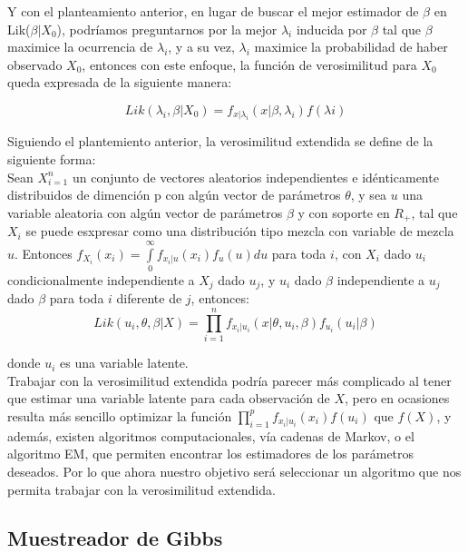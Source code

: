 \documentclass[11pt]{book}
\begin{document}
 
Y con el planteamiento anterior, en lugar de buscar el mejor estimador de $\beta$ en Lik($\beta|X_{0}$), podríamos preguntarnos por la mejor $\lambda_{i}$ inducida por $\beta$ tal que $\beta$ maximice la ocurrencia de $\lambda_{i}$, y a su vez, $\lambda_{i}$ maximice la probabilidad de haber observado  $X_{0}$,  entonces con este enfoque, la función de verosimilitud para $X_{0}$ queda expresada de la siguiente manera:

\begin{equation*}
Lik(\lambda_{i},\beta|X_{0})=f_{x|\lambda_{i}}(x|\beta,\lambda_{i})f(\lambda{i})
\end{equation*}
	
	Siguiendo el plantemiento anterior, la verosimilitud extendida se define de la siguiente forma:\\
	
	Sean ${X}_{i=1}^{n}$ un conjunto de vectores aleatorios independientes e idénticamente distribuidos de dimención p con algún vector de parámetros $\theta$, y sea $u$ una variable aleatoria con algún vector de parámetros $\beta$ y con soporte en $R_{+}$, tal que $X_{i}$ se puede esxpresar como una distribución tipo mezcla con variable de mezcla $u$. Entonces  $f_{X_{i}}(x_{i})=\underset{0}{\overset{\infty }{\int }}f_{x_{i}|u}(x_{i})f_{u}(u)du$ para toda $i$, con $X_{i}$ dado $u_{i}$ condicionalmente independiente a $X_{j}$ dado $u_{j}$, y $ u_{i}$ dado $\beta$ independiente a $u_{j}$ dado $\beta$ para toda $i$ diferente de $j$, entonces:\\
	\begin{equation*}
	Lik(u_{i},\theta,\beta |X)=\prod_{i=1}^{n}f_{x_{i}|u_{i}}(x|\theta, u_{i},\beta)f_{u_{i}}(u_{i}|\beta)
	\end{equation*}
	
	
	donde $u_{i}$ es una variable latente.\\
	
	Trabajar con la verosimilitud extendida podría parecer más complicado al tener que estimar una variable latente para cada observación de $X$, pero en ocasiones resulta más sencillo optimizar la función $\prod_{i=1}^{p}f_{x_{i}|u_{i}}(x_{i})f(u_{i})$ que $f(X)$, y además, existen algoritmos computacionales, vía cadenas de Markov, o el algoritmo EM, que permiten encontrar los estimadores de los parámetros deseados. Por lo que ahora nuestro objetivo será seleccionar un algoritmo que nos permita trabajar con la verosimilitud extendida.



\subsection*{Muestreador de Gibbs}
\end{document}
